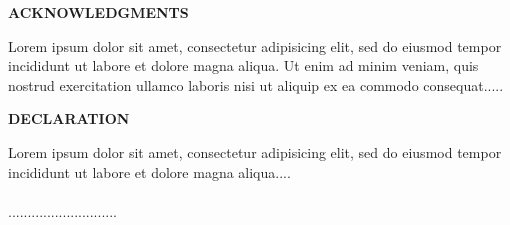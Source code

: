 \newpage
\thispagestyle{plain}
\vspace*{15cm}
\begin{large}
\noindent
\textbf{ACKNOWLEDGMENTS} \\
\end{large}
\noindent
Lorem ipsum dolor sit amet, consectetur adipisicing elit, sed do eiusmod tempor incididunt ut labore et dolore magna aliqua. Ut enim ad minim veniam, quis nostrud exercitation ullamco laboris nisi ut aliquip ex ea commodo consequat.....
\newpage
\thispagestyle{plain}
\vspace*{15cm}
\begin{large}
\noindent
\textbf{DECLARATION} \\
\end{large}
\noindent
Lorem ipsum dolor sit amet, consectetur adipisicing elit, sed do eiusmod tempor incididunt ut labore et dolore magna aliqua....\\
\vspace*{0.5cm}\\
\hspace*{10cm}............................\\
\hspace*{10.7cm} \Author
